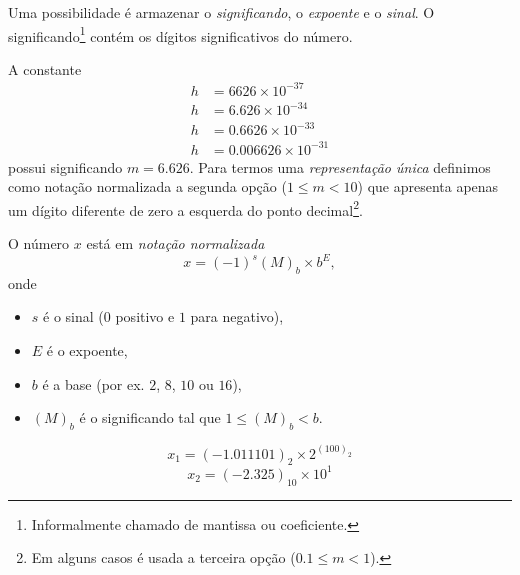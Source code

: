 \documentclass[main.tex]{subfiles}
\begin{document}
Uma possibilidade é armazenar o \emph{significando}, o \emph{expoente} e o \emph{sinal}. 
O significando\footnote{Informalmente chamado de mantissa ou coeficiente.} contém os dígitos significativos do número.

A constante
\begin{align*}
   h &=6626  \times 10^{-37} \\
   h &=6.626  \times 10^{-34} \\
   h &=0.6626 \times 10^{-33} \\
   h &=0.006626\times 10^{-31}
\end{align*}
possui significando $m=6.626$. Para termos uma \emph{representação única} definimos como notação normalizada
a segunda opção ($1\leq m<10$) que apresenta apenas um dígito diferente de zero a esquerda do ponto decimal\footnote{Em alguns casos é usada a terceira opção ($0.1\leq m <1$).}.

O número $x$ está em \emph{notação normalizada}
 $$ x=(-1)^{s}(M)_b \times b^{E}, $$
onde
\begin{itemize}
 \item $s$ é o sinal ($0$ positivo e $1$ para negativo),
 \item $E$ é o expoente,
 \item $b$ é a base (por ex. $2$, $8$, $10$ ou $16$),
 \item $(M)_b$ é o significando tal que $1\leq(M)_b<b$.
\end{itemize}

\begin{ex}
  $$x_1=(-1.011101)_2\times 2^{(100)_2}$$
  $$x_2=(-2.325)_{10}\times  10^{1}$$
\end{ex}


% 
% 
\end{document}
